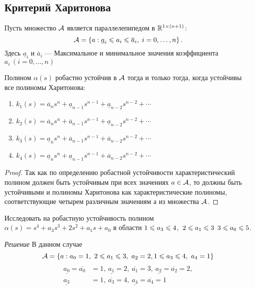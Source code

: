 \documentclass[../../TAU.tex]{subfiles}
\begin{document}
\subsection{Критерий Харитонова}

    Пусть множество $\mathcal{A}$ является параллелепипедом в $\mathbb{R}^{1\times (n+1)}$:
    $$
        \mathcal{A}=\left\{a: \underline{ a}_i\leqslant a_i \leqslant \overline a_i, \; i=0,\ldots,n\right\}.
    $$
    Здесь $\underline{a}_i$ и $\overline a_i$ ---
    Максимальное и минимальное значения коэффициента $a_i\ (i=0,\dots,n)$

    \begin{theor}
        Полином $\alpha(s)$ робастно устойчив в $\mathcal{A}$ тогда и только тогда, когда устойчивы все полиномы Харитонова:
        \begin{enumerate}
            \item 
                $k_1(s) = \overline{a}_n s^n + \underline{ a}_{n-1} s^{n-1} + \underline{ a}_{n-2} s^{n-2} + \cdots$\\
            \item 
                $k_2(s) = \overline a_n s^n + \overline a_{n-1} s^{n-1} + \underline{ a}_{n-2} s^{n-2} + \cdots$\\
            \item 
                $k_3(s) = \underline{ a}_n s^n + \overline a_{n-1} s^{n-1} + \overline a_{n-2} s^{n-2} + \cdots$\\
            \item 
                $k_4(s) = \underline{ a}_n s^n + \underline{ a}_{n-1} s^{n-1} + \overline a_{n-2} s^{n-2} + \cdots$
        \end{enumerate}

    \end{theor}

    \begin{proof}
        Так как по определению робастной устойчивости характеристический полином должен быть устойчивым при всех значениях $a\in \mathcal{A}$, то должны быть устойчивыми и полиномы Харитонова как характеристические полиномы, соответствующие четырем различным значениям $а$ из множества $\mathcal{A}$.
    \end{proof}

    \examp Исследовать на робастную устойчивость полином $\alpha(s) = s^4 + a_3 s^3 + 2 s^2 + a_1 s + a_0$ в области $1\leqslant a_3 \leqslant 4$,\ $ 2 \leqslant a_1 \leqslant 3$ $3\leqslant a_0\leqslant5$.

    {\it Решение}
    В данном случае 
    $$
        \mathcal{A} = \left\{a: a_0=1,\ 2\leqslant a_1 \leqslant 3,\ a_2 = 2, 1\leqslant a_3\leqslant 4,\ a_4=1\right\}
    $$
    \begin{align*}
        \underline{a_0}=\overline{a_0}&=1,\ 
        \underline{a_1}=2,\ \overline{a_1}=3,\
        \underline{a_2}=\overline{a_2}=2,\\
        \underline{a_3}&=1,\ \overline{a_3}=4,\ 
        \underline{a_4}=\overline{a_4}=1
    \end{align*}
\end{document}
